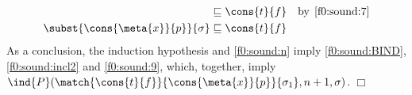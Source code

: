 \begin{enumerate}
\begin{enumerate}
\begin{align}
          &\sqsubseteq \cons{t}{f}
          &\text{by} \,\; \eqref{f0:sound:7}\notag\\
            \subst{\cons{\meta{x}}{p}}{\sigma}
          &\sqsubseteq \cons{t}{f} \label{f0:sound:9}
        \end{align}
        As a conclusion, the induction hypothesis and
        \eqref{f0:sound:n} imply \eqref{f0:sound:BIND},
        \eqref{f0:sound:incl2} and \eqref{f0:sound:9}, which,
        together, imply 
        \(\ind{P}(\match{\cons{t}{f}}%
                        {\cons{\meta{x}}{p}}%
                        {\sigma_1},%
                  n+1, \sigma)\). \hfill \(\Box\)

    \end{enumerate}

\end{enumerate}
